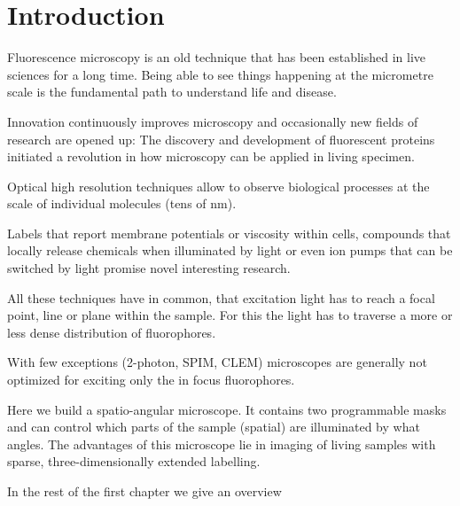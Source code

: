 \chapter{Introduction}
Fluorescence microscopy is an old technique that has been established
in live sciences for a long time. Being able to see things happening
at the micrometre scale is the fundamental path to understand life and
disease.

Innovation continuously improves microscopy and occasionally new
fields of research are opened up: The discovery and development of
fluorescent proteins initiated a revolution in how microscopy can be
applied in living specimen. 

Optical high resolution techniques allow
to observe biological processes at the scale of individual molecules
(tens of nm). 

Labels that report membrane potentials or viscosity within cells,
compounds that locally release chemicals when illuminated by light or
even ion pumps that can be switched by light promise novel interesting
research.

All these techniques have in common, that excitation light has to
reach a focal point, line or plane within the sample. For this the
light has to traverse a more or less dense distribution of
fluorophores.

With few exceptions (2-photon, SPIM, CLEM) microscopes are generally
not optimized for exciting only the in focus fluorophores.

Here we build a spatio-angular microscope. It contains two
programmable masks and can control which parts of the sample (spatial)
are illuminated by what angles. The advantages of this microscope lie
in imaging of living samples with sparse, three-dimensionally
extended labelling.


In the rest of the first chapter we give an overview 